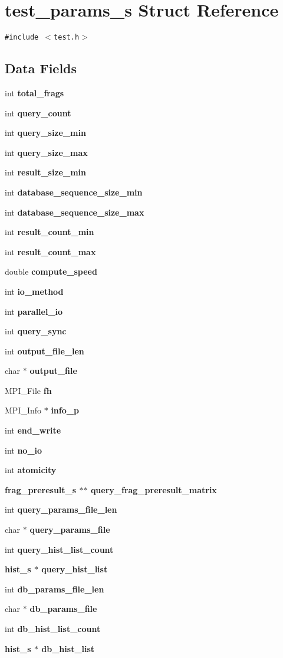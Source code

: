 \section{test\_\-params\_\-s Struct Reference}
\label{structtest__params__s}
{\tt \#include $<$test.h$>$}

\subsection*{Data Fields}
\begin{CompactItemize}
\item 
int \bf{total\_\-frags}
\item 
int \bf{query\_\-count}
\item 
int \bf{query\_\-size\_\-min}
\item 
int \bf{query\_\-size\_\-max}
\item 
int \bf{result\_\-size\_\-min}
\item 
int \bf{database\_\-sequence\_\-size\_\-min}
\item 
int \bf{database\_\-sequence\_\-size\_\-max}
\item 
int \bf{result\_\-count\_\-min}
\item 
int \bf{result\_\-count\_\-max}
\item 
double \bf{compute\_\-speed}
\item 
int \bf{io\_\-method}
\item 
int \bf{parallel\_\-io}
\item 
int \bf{query\_\-sync}
\item 
int \bf{output\_\-file\_\-len}
\item 
char $\ast$ \bf{output\_\-file}
\item 
MPI\_\-File \bf{fh}
\item 
MPI\_\-Info $\ast$ \bf{info\_\-p}
\item 
int \bf{end\_\-write}
\item 
int \bf{no\_\-io}
\item 
int \bf{atomicity}
\item 
\bf{frag\_\-preresult\_\-s} $\ast$$\ast$ \bf{query\_\-frag\_\-preresult\_\-matrix}
\item 
int \bf{query\_\-params\_\-file\_\-len}
\item 
char $\ast$ \bf{query\_\-params\_\-file}
\item 
int \bf{query\_\-hist\_\-list\_\-count}
\item 
\bf{hist\_\-s} $\ast$ \bf{query\_\-hist\_\-list}
\item 
int \bf{db\_\-params\_\-file\_\-len}
\item 
char $\ast$ \bf{db\_\-params\_\-file}
\item 
int \bf{db\_\-hist\_\-list\_\-count}
\item 
\bf{hist\_\-s} $\ast$ \bf{db\_\-hist\_\-list}
\end{CompactItemize}


